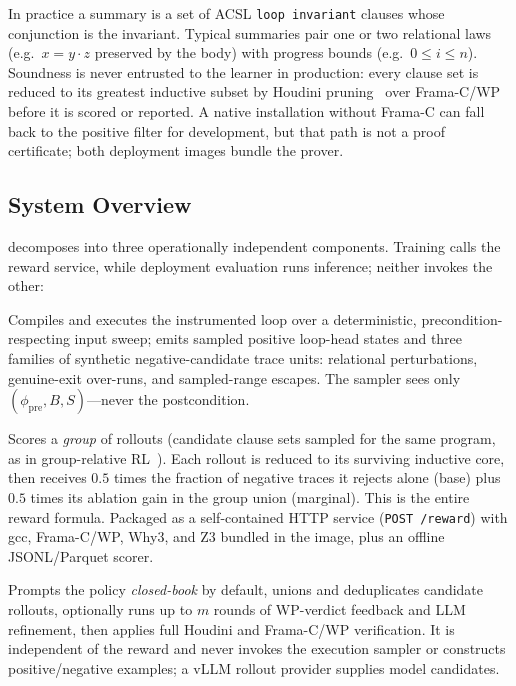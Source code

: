 In practice a summary is a set of ACSL \texttt{loop invariant} clauses whose conjunction is the invariant.  Typical summaries pair one or two relational laws (e.g.\ $x = y \cdot z$ preserved by the body) with progress bounds (e.g.\ $0 \le i \le n$).
Soundness is never entrusted to the learner in production: every clause set is reduced to its greatest inductive subset by Houdini pruning~\citep{flanagan2001houdini} over Frama-C/WP~\citep{framac} before it is scored or reported.  A native installation without Frama-C can fall back to the positive filter for development, but that path is not a proof certificate; both deployment images bundle the prover.

\subsection{System Overview}
\label{sec:overview:system}

\sam{} decomposes into three operationally independent components.  Training calls the reward service, while deployment evaluation runs inference; neither invokes the other:

\begin{stepbox}
Compiles and executes the instrumented loop over a deterministic, precondition-respecting input sweep; emits sampled positive loop-head states and three families of synthetic negative-candidate trace units: relational perturbations, genuine-exit over-runs, and sampled-range escapes.
The sampler sees only $(\phi_{\mathrm{pre}}, B, S)$---never the postcondition.
\end{stepbox}

\begin{stepbox}
Scores a \emph{group} of rollouts (candidate clause sets sampled for the same program, as in group-relative RL~\citep{shao2024deepseekmath}).
Each rollout is reduced to its surviving inductive core, then receives $0.5$ times the fraction of negative traces it rejects alone (base) plus $0.5$ times its ablation gain in the group union (marginal).  This is the entire reward formula.
Packaged as a self-contained HTTP service (\texttt{POST /reward}) with gcc, Frama-C/WP, Why3, and Z3 bundled in the image, plus an offline JSONL/Parquet scorer.
\end{stepbox}

\begin{stepbox}
Prompts the policy \emph{closed-book} by default, unions and deduplicates candidate rollouts, optionally runs up to $m$ rounds of WP-verdict feedback and LLM refinement, then applies full Houdini and Frama-C/WP verification.
It is independent of the reward and never invokes the execution sampler or constructs positive/negative examples; a vLLM rollout provider supplies model candidates.
\end{stepbox}

